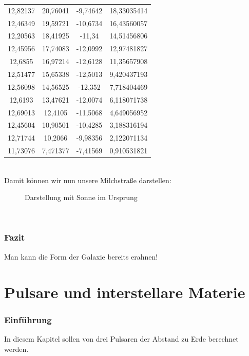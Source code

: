 \documentclass[12pt]{article}
\begin{document}
\begin{minipage}{.5\textwidth}
{\begin{tabular}{|c|c|c|c}
            12,82137 & 20,76041 & -9,74642 & 18,33035414 \\ 
            12,46349 & 19,59721 & -10,6734 & 16,43560057 \\ 
            12,20563 & 18,41925 & -11,34 & 14,51456806 \\ 
            12,45956 & 17,74083 & -12,0992 & 12,97481827 \\ 
            12,6855 & 16,97214 & -12,6128 & 11,35657908 \\ 
            12,51477 & 15,65338 & -12,5013 & 9,420437193 \\ 
            12,56098 & 14,56525 & -12,352 & 7,718404469 \\ 
            12,6193 & 13,47621 & -12,0074 & 6,118071738 \\ 
            12,69013 & 12,4105 & -11,5068 & 4,649056952 \\ 
            12,45604 & 10,90501 & -10,4285 & 3,188316194 \\ 
            12,71744 & 10,2066 & -9,98356 & 2,122071134 \\ 
            11,73076 & 7,471377 & -7,41569 & 0,910531821 \\ 
        \end{tabular}}
    \end{minipage}\\
Damit können wir nun unsere Milchstraße darstellen:
\begin{figure}[h!]
    \centering
{}
\caption[short]{Darstellung mit Sonne im Ursprung}
\end{figure}\\
\subsubsection*{Fazit}
Man kann die Form der Galaxie bereits erahnen! 
\section{Pulsare und interstellare Materie}
\subsubsection*{Einführung}
In diesem Kapitel sollen von drei Pulsaren der Abstand zu Erde berechnet werden.
\end{document}
